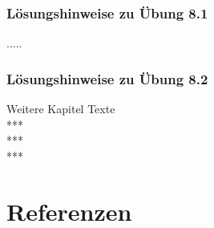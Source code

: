 \documentclass[12pt]{article}
\begin{document}
\subsubsection{Lösungshinweise zu Übung 8.1}
.....\\
\subsubsection{Lösungshinweise zu Übung 8.2}
Weitere Kapitel Texte \\
***\\
***\\
***

\newpage

\section{Referenzen}
\end{document}
